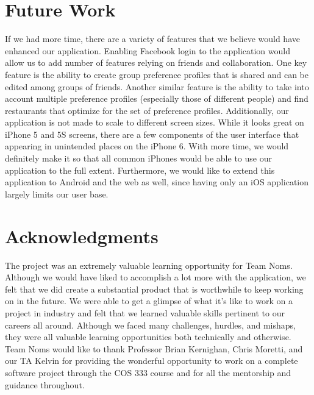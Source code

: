 \documentclass[12pt]{article}
\begin{document}
\section{Future Work}

If we had more time, there are a variety of features that we believe would have enhanced our application. Enabling Facebook login to the application would allow us to add number of features relying on friends and collaboration. One key feature is the ability to create group preference profiles that is shared and can be edited among groups of friends. Another similar feature is the ability to take into account multiple preference profiles (especially those of different people) and find restaurants that optimize for the set of preference profiles. 
Additionally, our application is not made to scale to different screen sizes. While it looks great on iPhone 5 and 5S screens, there are a few components of the user interface that appearing in unintended places on the iPhone 6. With more time, we would definitely make it so that all common iPhones would be able to use our application to the full extent. Furthermore, we would like to extend this application to Android and the web as well, since having only an iOS application largely limits our user base.

\section{Acknowledgments}
The project was an extremely valuable learning opportunity for Team Noms. Although we would have liked to accomplish a lot more with the application, we felt that we did create a substantial product that is worthwhile to keep working on in the future. We were able to get a glimpse of what it's like to work on a project in industry and felt that we learned valuable skills pertinent to our careers all around. Although we faced many challenges, hurdles, and mishaps, they were all valuable learning opportunities both technically and otherwise. 
Team Noms would like to thank Professor Brian Kernighan, Chris Moretti, and our TA Kelvin for providing the wonderful opportunity to work on a complete software project through the COS 333 course and for all the mentorship and guidance throughout.
\end{document}
